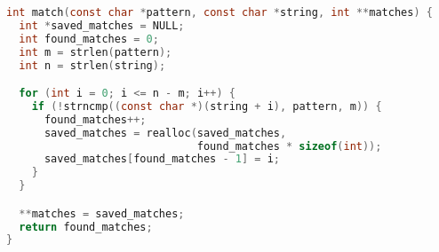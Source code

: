 \begin{lstlisting}[language=C,caption={C naive implementation},label={lst:naive_c}]
int match(const char *pattern, const char *string, int **matches) {
  int *saved_matches = NULL;
  int found_matches = 0;
  int m = strlen(pattern);
  int n = strlen(string);

  for (int i = 0; i <= n - m; i++) {
    if (!strncmp((const char *)(string + i), pattern, m)) {
      found_matches++;
      saved_matches = realloc(saved_matches,
                              found_matches * sizeof(int));
      saved_matches[found_matches - 1] = i;
    }
  }

  **matches = saved_matches;
  return found_matches;
}
\end{lstlisting}
